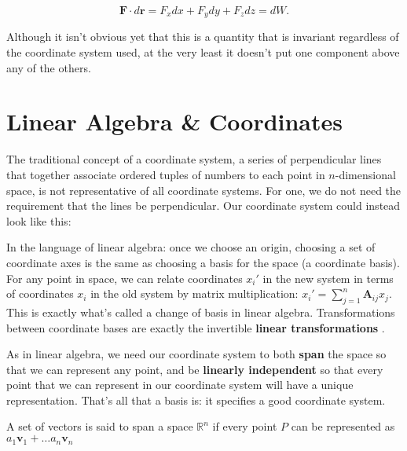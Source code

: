 \documentclass[../master.tex]{subfiles}
\begin{document}
	\begin{equation*}
		\mathbf F \cdot  d \mathbf r = F_x dx + F_y dy + F_z dz = d W.
	\end{equation*}
	
	 Although it isn't obvious yet that this is a quantity that is invariant regardless of the coordinate system used, at the very least it doesn't put one component above any of the others.

	
	
	\section{Linear Algebra \& Coordinates} 
	\label{sec:Linear Algebra & Coordinates}%
	
	
	The traditional concept of a coordinate system, a series of perpendicular lines that together associate ordered tuples of numbers to each point in $n$-dimensional space, is not representative of all coordinate systems. For one, we do not need the requirement that the lines be perpendicular. Our coordinate system could instead look like this:
	
	
	In the language of linear algebra: once we choose an origin, choosing a set of coordinate axes is the same as choosing a basis for the space (a coordinate basis). For any point in space, we can relate coordinates $x_i'$ in the new system in terms of coordinates $x_i$ in the old system by matrix multiplication: $x_i' = \sum_{j=1}^n \mathbf A_{ij} x_j$. This is exactly what's called a change of basis in linear algebra. Transformations between coordinate bases are exactly the invertible \textbf{linear transformations} .
	
	As in linear algebra, we need our coordinate system to both \textbf{span} the space so that we can represent any point, and be \textbf{linearly independent} so that every point that we can represent in our coordinate system will have a unique representation. That's all that a basis is: it specifies a good coordinate system. 
	
	\begin{defn}
		A set of vectors is said to span a space $\mathbb{R}^n$ if every point $P$ can be represented as $a_1 \mathbf v_1 + \dots a_n \mathbf v_n$
	\end{defn}
	
\end{document}
